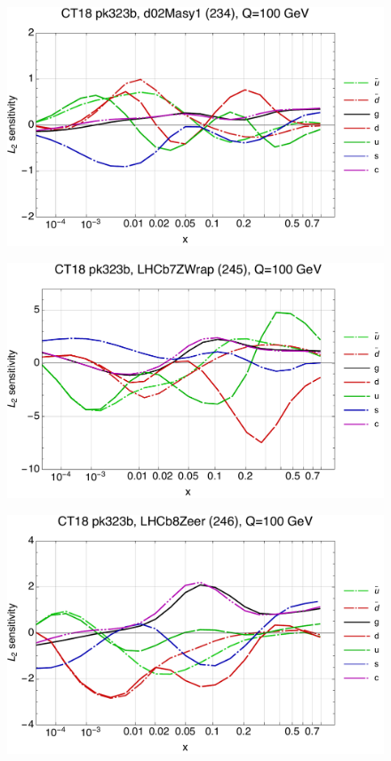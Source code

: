 \documentclass[10pt,aps,prd,floatfix,titlepage]{revtex4}
\begin{document}
\clearpage
\begin{figure}
\includegraphics[width=\textwidth,height=0.44\textheight,keepaspectratio]{1/234_ct18nn_L2_q100_Sf_1.pdf}
\caption{}
\end{figure}
\begin{figure}
\includegraphics[width=\textwidth,height=0.44\textheight,keepaspectratio]{1/245_ct18nn_L2_q100_Sf_1.pdf}
\caption{}
\end{figure}
\clearpage
\begin{figure}
\includegraphics[width=\textwidth,height=0.44\textheight,keepaspectratio]{1/246_ct18nn_L2_q100_Sf_1.pdf}
\caption{}
\end{figure}
\end{document}
